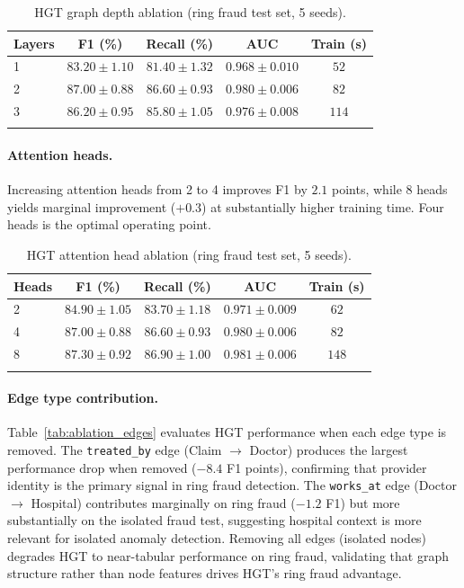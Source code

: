 \documentclass[pdflatex,sn-mathphys-num]{sn-jnl}
\theoremstyle{thmstyleone}
\theoremstyle{thmstyletwo}
\theoremstyle{thmstylethree}
\begin{document}
\begin{table}[h]
\caption{HGT graph depth ablation (ring fraud test set, 5 seeds).}\label{tab:ablation_depth}
\begin{tabular}{@{}lcccc@{}}
\toprule
Layers & F1 (\%) & Recall (\%) & AUC & Train (s) \\
\midrule
1 & $83.20 \pm 1.10$ & $81.40 \pm 1.32$ & $0.968 \pm 0.010$ & $52$ \\
2 & $\mathbf{87.00} \pm 0.88$ & $\mathbf{86.60} \pm 0.93$ & $\mathbf{0.980} \pm 0.006$ & $82$ \\
3 & $86.20 \pm 0.95$ & $85.80 \pm 1.05$ & $0.976 \pm 0.008$ & $114$ \\
\botrule
\end{tabular}
\end{table}

\paragraph{Attention heads.}
Increasing attention heads from 2 to 4 improves F1 by $2.1$ points,
while 8 heads yields marginal improvement ($+0.3$) at substantially
higher training time. Four heads is the optimal operating point.

\begin{table}[h]
\caption{HGT attention head ablation (ring fraud test set, 5 seeds).}\label{tab:ablation_heads}
\begin{tabular}{@{}lcccc@{}}
\toprule
Heads & F1 (\%) & Recall (\%) & AUC & Train (s) \\
\midrule
2 & $84.90 \pm 1.05$ & $83.70 \pm 1.18$ & $0.971 \pm 0.009$ & $62$ \\
4 & $\mathbf{87.00} \pm 0.88$ & $\mathbf{86.60} \pm 0.93$ & $\mathbf{0.980} \pm 0.006$ & $82$ \\
8 & $87.30 \pm 0.92$ & $86.90 \pm 1.00$ & $0.981 \pm 0.006$ & $148$ \\
\botrule
\end{tabular}
\end{table}

\paragraph{Edge type contribution.}
Table~\ref{tab:ablation_edges} evaluates HGT performance when each edge
type is removed. The \texttt{treated\_by} edge (Claim $\to$ Doctor)
produces the largest performance drop when removed ($-8.4$ F1 points),
confirming that provider identity is the primary signal in ring fraud
detection. The \texttt{works\_at} edge (Doctor $\to$ Hospital)
contributes marginally on ring fraud ($-1.2$ F1) but more substantially
on the isolated fraud test, suggesting hospital context is more relevant
for isolated anomaly detection. Removing all edges (isolated nodes)
degrades HGT to near-tabular performance on ring fraud, validating that
graph structure rather than node features drives HGT's ring fraud
advantage.
\end{document}
